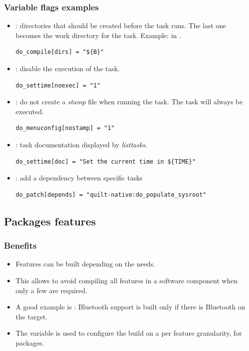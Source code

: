 \begin{frame}[fragile]
  \frametitle{Variable flags examples}
  \begin{itemize}
    \item {}: directories that should be created before the task
      runs. The last one becomes the work directory for the task.
      Example:  in .
      \begin{verbatim}
do_compile[dirs] = "${B}"
      \end{verbatim}
    \item {}: disable the execution of the task.
      \begin{verbatim}
do_settime[noexec] = "1"
      \end{verbatim}
    \item {}: do not create a {\em stamp} file when running the
      task. The task will always be executed.
      \begin{verbatim}
do_menuconfig[nostamp] = "1"
      \end{verbatim}
    \item {}: task documentation displayed by {\em listtasks}.
      \begin{verbatim}
do_settime[doc] = "Set the current time in ${TIME}"
      \end{verbatim}
    \item {}: add a dependency between specific tasks
      \begin{verbatim}
do_patch[depends] = "quilt-native:do_populate_sysroot"
      \end{verbatim}
  \end{itemize}
\end{frame}

\subsection{Packages features}

\begin{frame}
  \frametitle{Benefits}
  \begin{itemize}
    \item Features can be built depending on the needs.
    \item This allows to avoid compiling all features in a software
      component when only a few are required.
    \item A good example is : Bluetooth support
      is built only if there is Bluetooth on the target.
    \item The  variable is used to configure the
      build on a per feature granularity, for packages.
  \end{itemize}
\end{frame}

